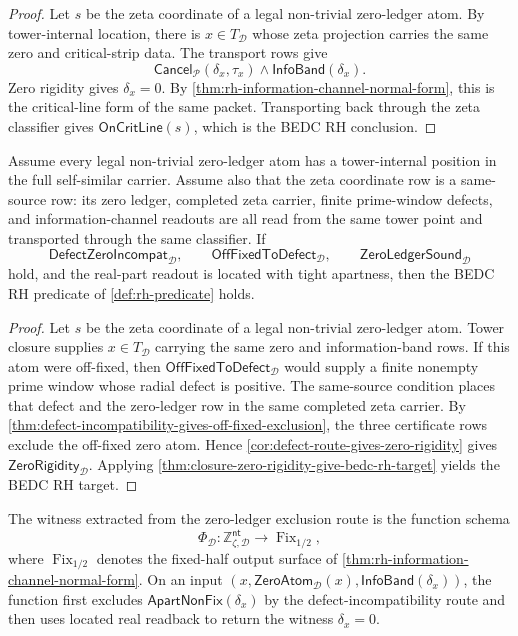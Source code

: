 \begin{proof}
Let $s$ be the zeta coordinate of a legal non-trivial zero-ledger atom.  By
tower-internal location, there is $x\in T_{\mathcal D}$ whose zeta
projection carries the same zero and critical-strip data.  The transport
rows give
$$
\mathsf{Cancel}_{\mathcal P}(\delta_x,\tau_x)
\wedge
\mathsf{InfoBand}(\delta_x).
$$
Zero rigidity gives $\delta_x=0$.  By
\autoref{thm:rh-information-channel-normal-form}, this is the critical-line
form of the same packet.  Transporting back through the zeta classifier
gives $\mathsf{OnCritLine}(s)$, which is the BEDC RH conclusion.
\end{proof}

\begin{theorem}
\label{thm:coinductive-defect-route-gives-bedc-rh-target}
Assume every legal non-trivial zero-ledger atom has a tower-internal
position in the full self-similar carrier.  Assume also that the zeta
coordinate row is a same-source row: its zero ledger, completed zeta
carrier, finite prime-window defects, and information-channel readouts are
all read from the same tower point and transported through the same
classifier.  If
$$
\mathsf{DefectZeroIncompat}_{\mathcal D},
\qquad
\mathsf{OffFixedToDefect}_{\mathcal D},
\qquad
\mathsf{ZeroLedgerSound}_{\mathcal D}
$$
hold, and the real-part readout is located with tight apartness, then the
BEDC RH predicate of \autoref{def:rh-predicate} holds.
\end{theorem}

\begin{proof}
Let $s$ be the zeta coordinate of a legal non-trivial zero-ledger atom.
Tower closure supplies $x\in T_{\mathcal D}$ carrying the same zero and
information-band rows.  If this atom were off-fixed, then
$\mathsf{OffFixedToDefect}_{\mathcal D}$ would supply a finite nonempty
prime window whose radial defect is positive.  The same-source condition
places that defect and the zero-ledger row in the same completed zeta
carrier.  By
\autoref{thm:defect-incompatibility-gives-off-fixed-exclusion}, the three
certificate rows exclude the off-fixed zero atom.  Hence
\autoref{cor:defect-route-gives-zero-rigidity} gives
$\mathsf{ZeroRigidity}_{\mathcal D}$.  Applying
\autoref{thm:closure-zero-rigidity-give-bedc-rh-target} yields the BEDC RH
target.
\end{proof}

\begin{definition}
\label{def:constructive-rh-witness-extracted-exclusion}
The witness extracted from the zero-ledger exclusion route is the function
schema
$$
\Phi_{\mathcal D}:
\mathbb Z^{\mathsf{nt}}_{\zeta,\mathcal D}
\to
\operatorname{Fix}_{1/2},
$$
where $\operatorname{Fix}_{1/2}$ denotes the fixed-half output surface of
\autoref{thm:rh-information-channel-normal-form}.  On an input
$(x,\mathsf{ZeroAtom}_{\mathcal D}(x),\mathsf{InfoBand}(\delta_x))$, the
function first excludes $\mathsf{ApartNonFix}(\delta_x)$ by the
defect-incompatibility route and then uses located real readback to return
the witness $\delta_x=0$.
\end{definition}

